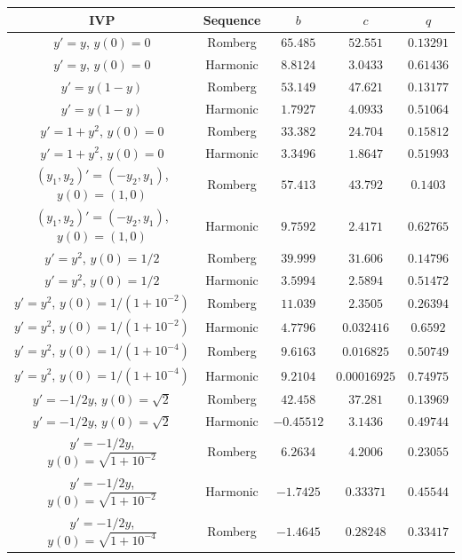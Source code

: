 \begin{table}[H]
    \centering
    \begin{tabular}{c|c||c|c|c}
           IVP & Sequence & \(b\) & \(c\) & \(q\) \\\hline\hline
$y'=y$, $y(0) = 0$ & Romberg & \(65.485\) & \(52.551\) & \(0.13291\) \\
$y'=y$, $y(0) = 0$ & Harmonic & \(8.8124\) & \(3.0433\) & \(0.61436\) \\
$y' = y(1-y)$ & Romberg & \(53.149\) & \(47.621\) & \(0.13177\) \\
$y' = y(1-y)$ & Harmonic & \(1.7927\) & \(4.0933\) & \(0.51064\) \\
$y' = 1 + y^2$, $y(0) = 0$ & Romberg & \(33.382\) & \(24.704\) & \(0.15812\) \\
$y' = 1 + y^2$, $y(0) = 0$ & Harmonic & \(3.3496\) & \(1.8647\) & \(0.51993\)  \\
$(y_1,y_2)' = (-y_2,y_1)$, $y(0) = (1,0)$ & Romberg & \(57.413\) & \(43.792\) & \(0.1403\) \\
$(y_1,y_2)' = (-y_2,y_1)$, $y(0) = (1,0)$ & Harmonic & \(9.7592\) & \(2.4171\) & \(0.62765\) \\
$y' = y^2$, $y(0) = 1/2$ & Romberg & \(39.999\) & \(31.606\) & \(0.14796\) \\
$y' = y^2$, $y(0) = 1/2$ & Harmonic & \(3.5994\) & \(2.5894\) & \(0.51472\)  \\
$y'=y^2$, $y(0) = 1/(1+10^{-2})$ & Romberg & \(11.039\) & \(2.3505\) & \(0.26394\)  \\
$y'=y^2$, $y(0) = 1/(1+10^{-2})$ & Harmonic & \(4.7796\) & \(0.032416\) & \(0.6592\) \\
$y'=y^2$, $y(0) = 1/(1+10^{-4})$ & Romberg & \(9.6163\) & \(0.016825\) & \(0.50749\) \\
$y'=y^2$, $y(0) = 1/(1+10^{-4})$ & Harmonic & \(9.2104\) & \(0.00016925\) & \(0.74975\) \\
$y' = -1/2y$, $y(0) = \sqrt{2}$ & Romberg & \(42.458\) & \(37.281\) & \(0.13969\) \\
$y' = -1/2y$, $y(0) = \sqrt{2}$ & Harmonic & \(-0.45512\) & \(3.1436\) & \(0.49744\) \\
$y' = -1/2y$, $y(0) = \sqrt{1+10^{-2}}$ & Romberg & \(6.2634\) & \(4.2006\) & \(0.23055\)\\
$y' = -1/2y$, $y(0) = \sqrt{1+10^{-2}}$ & Harmonic & \(-1.7425\) & \(0.33371\) & \(0.45544\) \\
$y' = -1/2y$, $y(0) = \sqrt{1+10^{-4}}$ & Romberg & \(-1.4645\) & \(0.28248\) & \(0.33417\)\\

\end{tabular}
\end{table}
